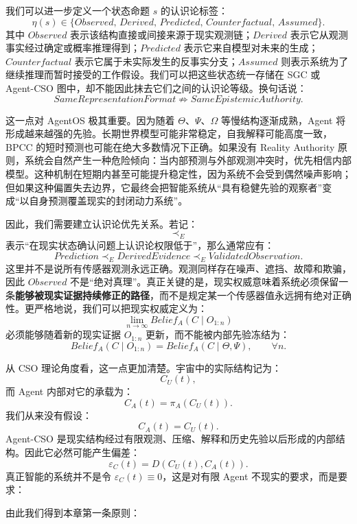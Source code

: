 我们可以进一步定义一个状态命题 $s$ 的认识论标签：
\[
\eta(s)\in
\{
Observed,\,
Derived,\,
Predicted,\,
Counterfactual,\,
Assumed
\}.
\]
其中 $Observed$ 表示该结构直接或间接来源于现实观测链；$Derived$ 表示它从观测事实经过确定或概率推理得到；$Predicted$ 表示它来自模型对未来的生成；$Counterfactual$ 表示它属于未实际发生的反事实分支；$Assumed$ 则表示系统为了继续推理而暂时接受的工作假设。我们可以把这些状态统一存储在 SGC 或 Agent-CSO 图中，却不能因此抹去它们之间的认识论等级。换句话说：
\[
SameRepresentationFormat
\not\Rightarrow
SameEpistemicAuthority.
\]

这一点对 AgentOS 极其重要。因为随着 $\Theta$、$\Psi$、$\Omega$ 等慢结构逐渐成熟，Agent 将形成越来越强的先验。长期世界模型可能非常稳定，自我解释可能高度一致，BPCC 的短时预测也可能在绝大多数情况下正确。如果没有 Reality Authority 原则，系统会自然产生一种危险倾向：当内部预测与外部观测冲突时，优先相信内部模型。这种机制在短期内甚至可能提升稳定性，因为系统不会受到偶然噪声影响；但如果这种偏置失去边界，它最终会把智能系统从``具有稳健先验的观察者''变成``以自身预测覆盖现实的封闭动力系统''。

因此，我们需要建立认识论优先关系。若记：
\[
\prec_E
\]
表示``在现实状态确认问题上认识论权限低于''，那么通常应有：
\[
Prediction
\prec_E
DerivedEvidence
\prec_E
ValidatedObservation.
\]
这里并不是说所有传感器观测永远正确。观测同样存在噪声、遮挡、故障和欺骗，因此 $Observed$ 不是``绝对真理''。真正关键的是，现实权威意味着系统必须保留一条\textbf{能够被现实证据持续修正的路径}，而不是规定某一个传感器值永远拥有绝对正确性。更严格地说，我们可以把现实权威定义为：
\[
\boxed{
\lim_{n\rightarrow\infty}
Belief_A(C\mid O_{1:n})
}
\]
必须能够随着新的现实证据 $O_{1:n}$ 更新，而不能被内部先验冻结为：
\[
Belief_A(C\mid O_{1:n})
=
Belief_A(C\mid \Theta,\Psi),
\qquad
\forall n.
\]

从 CSO 理论角度看，这一点更加清楚。宇宙中的实际结构记为：
\[
C_U(t),
\]
而 Agent 内部对它的承载为：
\[
C_A(t)=\pi_A(C_U(t)).
\]
我们从来没有假设：
\[
C_A(t)=C_U(t).
\]
Agent-CSO 是现实结构经过有限观测、压缩、解释和历史先验以后形成的内部结构。因此它必然可能产生偏差：
\[
\varepsilon_C(t)
=
D\left(
C_U(t),
C_A(t)
\right).
\]
真正智能的系统并不是令 $\varepsilon_C(t)\equiv0$，这是对有限 Agent 不现实的要求，而是要求：
\begin{statementbox}
\centering
{}
\end{statementbox}

由此我们得到本章第一条原则：


